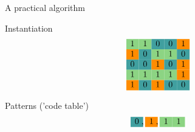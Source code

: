 \documentclass[11pt]{beamer}
\begin{document}

\begin{frame}{A practical algorithm}

\newcommand{\ca}{\cellcolor{cyan!45!yellow}}
\newcommand{\cb}{\cellcolor{red!75!blue}}
\newcommand{\cc}{\cellcolor{violet}}
\newcommand{\cd}{\cellcolor{teal!75}}
\newcommand{\ce}{\cellcolor{red!45!yellow}}

Instantiation
$$
\begin{matrix}
\ca 1 & \ca 1 & \cd 0 & \cd 0 & \ce 1  \\
\ce 1 & \cd 0 & \ca 1 & \ca 1 & \cd 0  \\
\cd 0 & \cd 0 & \ce 1 & \cd 0 & \ce 1  \\
\ca 1 & \ca 1 & \ca 1 & \ca 1 & \ce 1  \\
\ce 1 & \cd 0 & \ce 1 & \cd 0 & \cd 0  \\
\end{matrix}
$$

\small
Patterns ('code table')
$$
\begin{matrix}
\cd 0  \\
\end{matrix} \;,\enspace
\begin{matrix}
\ce 1 \\
\end{matrix} \;,\enspace
\begin{matrix}
\ca 1 & \ca 1 \\
\end{matrix}
$$ 
\end{frame}

\end{document}
